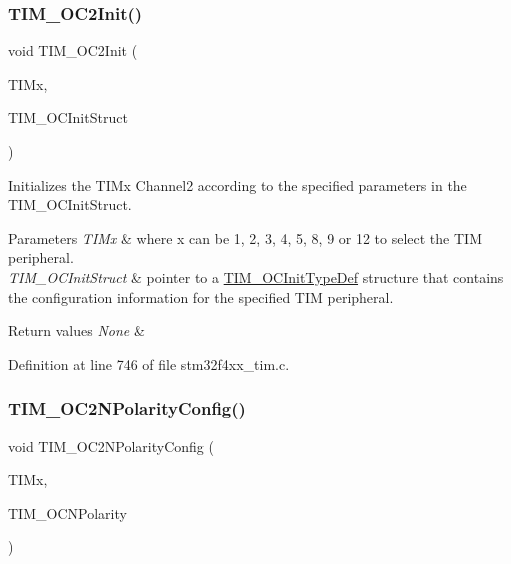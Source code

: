 \subsubsection{\texorpdfstring{T\+I\+M\+\_\+\+O\+C2\+Init()}{TIM\_OC2Init()}}
{\footnotesize\ttfamily void T\+I\+M\+\_\+\+O\+C2\+Init (\begin{DoxyParamCaption}\item[{\hyperlink{struct_t_i_m___type_def}{T\+I\+M\+\_\+\+Type\+Def} $\ast$}]{T\+I\+Mx,  }\item[{\hyperlink{struct_t_i_m___o_c_init_type_def}{T\+I\+M\+\_\+\+O\+C\+Init\+Type\+Def} $\ast$}]{T\+I\+M\+\_\+\+O\+C\+Init\+Struct }\end{DoxyParamCaption})}



Initializes the T\+I\+Mx Channel2 according to the specified parameters in the T\+I\+M\+\_\+\+O\+C\+Init\+Struct. 


\begin{DoxyParams}{Parameters}
{\em T\+I\+Mx} & where x can be 1, 2, 3, 4, 5, 8, 9 or 12 to select the T\+IM peripheral. \\
\hline
{\em T\+I\+M\+\_\+\+O\+C\+Init\+Struct} & pointer to a \hyperlink{struct_t_i_m___o_c_init_type_def}{T\+I\+M\+\_\+\+O\+C\+Init\+Type\+Def} structure that contains the configuration information for the specified T\+IM peripheral. \\
\hline
\end{DoxyParams}

\begin{DoxyRetVals}{Return values}
{\em None} & \\
\hline
\end{DoxyRetVals}


Definition at line 746 of file stm32f4xx\+\_\+tim.\+c.

\mbox{\label{group___t_i_m_ga2fa6ea3a89f446b52b4e699272b70cad}} 
\subsubsection{\texorpdfstring{T\+I\+M\+\_\+\+O\+C2\+N\+Polarity\+Config()}{TIM\_OC2NPolarityConfig()}}
{\footnotesize\ttfamily void T\+I\+M\+\_\+\+O\+C2\+N\+Polarity\+Config (\begin{DoxyParamCaption}\item[{\hyperlink{struct_t_i_m___type_def}{T\+I\+M\+\_\+\+Type\+Def} $\ast$}]{T\+I\+Mx,  }\item[{uint16\+\_\+t}]{T\+I\+M\+\_\+\+O\+C\+N\+Polarity }\end{DoxyParamCaption})}



